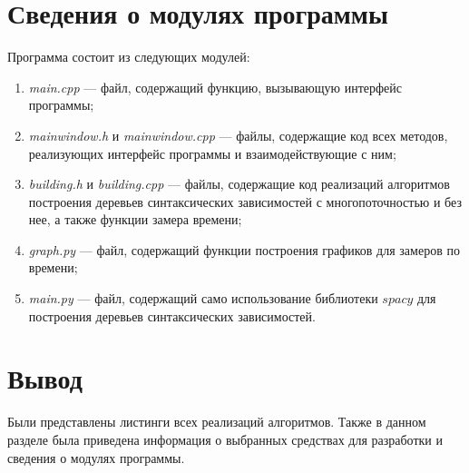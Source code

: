 \section{Сведения о модулях программы}
Программа состоит из следующих модулей:
\begin{enumerate}[label=\arabic*)]
	\item \textit{main.cpp} --- файл, содержащий функцию, вызывающую интерфейс программы;
    \item \textit{mainwindow.h} и \textit{mainwindow.cpp} --- файлы, содержащие код всех методов, реализующих интерфейс программы и взаимодействующие с ним;
	\item \textit{building.h} и \textit{building.cpp} --- файлы, содержащие код реализаций алгоритмов построения деревьев синтаксических зависимостей с многопоточностью и без нее, а также функции замера времени;
	\item \textit{graph.py} --- файл, содержащий функции построения графиков для замеров по времени;
	\item \textit{main.py} --- файл, содержащий само использование библиотеки $spacy$ для построения деревьев синтаксических зависимостей.
\end{enumerate}

\section*{Вывод}

Были представлены листинги всех реализаций алгоритмов. Также в данном разделе была приведена информация о выбранных средствах для разработки и сведения о модулях программы.
